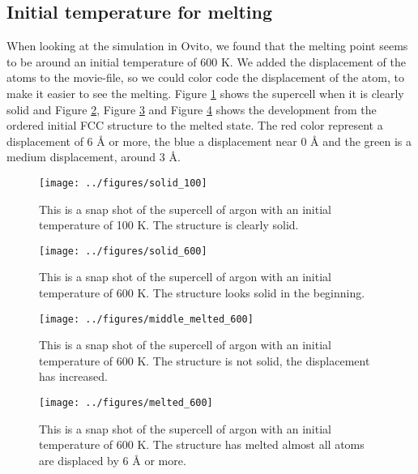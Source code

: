 \subsection{Initial temperature for melting}

When looking at the simulation in Ovito, we found that the melting point seems to be around an initial temperature of 600 K. We added the displacement of the atoms to the movie-file, so we could color code the displacement of the atom, to make it easier to see the melting. Figure \ref{fig:solid_100K} shows the supercell when it is clearly solid and Figure \ref{fig:solid_600K}, Figure \ref{fig:almost_melted_600K} and Figure \ref{fig:melted_600K} shows the development from the ordered initial FCC structure to the melted state. The red color represent a displacement of 6 Å or more, the blue a displacement near 0 Å and the green is a medium displacement, around 3 Å. 

\begin{multicols}{2}

\begin{figure}[H]
\texttt{[image: ../figures/solid\_100]}\caption{This is a snap shot of the supercell of argon with an initial temperature of 100 K. The structure is clearly solid.}\label{fig:solid_100K}
\end{figure}

\begin{figure}[H]
\texttt{[image: ../figures/solid\_600]}\caption{This is a snap shot of the supercell of argon with an initial temperature of 600 K. The structure looks solid in the beginning.}\label{fig:solid_600K}
\end{figure}

\begin{figure}[H]
\texttt{[image: ../figures/middle\_melted\_600]}\caption{This is a snap shot of the supercell of argon with an initial temperature of 600 K. The structure is not solid, the displacement has increased.}\label{fig:almost_melted_600K}
\end{figure}

\begin{figure}[H]
\texttt{[image: ../figures/melted\_600]}\caption{This is a snap shot of the supercell of argon with an initial temperature of 600 K. The structure has melted almost all atoms are displaced by 6 Å or more.}\label{fig:melted_600K}
\end{figure}

\end{multicols}

